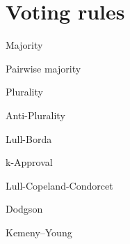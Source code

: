 	
%

\section{Voting rules}

\begin{genthm}{Majority}
	
\end{genthm}

\begin{genthm}{Pairwise majority}
	
\end{genthm}

\begin{genthm}{Plurality}
	
\end{genthm}

\begin{genthm}{Anti-Plurality}
	
\end{genthm}

\begin{genthm}{Lull-Borda}
	
\end{genthm}

\begin{genthm}{k-Approval}
	
\end{genthm}

\begin{genthm}{Lull-Copeland-Condorcet}
	
\end{genthm}

\begin{genthm}{Dodgson}
	
\end{genthm}

\begin{genthm}{Kemeny–Young}
	
\end{genthm}

